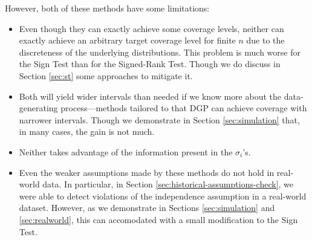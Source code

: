 \documentclass[letterpaper,12pt]{article}
\begin{document}
However, both of these methods have some limitations:
\begin{itemize}
\item Even though they can exactly achieve some coverage levels, neither can exactly achieve an arbitrary target coverage level for finite $n$ due to the discreteness of the underlying distributions. This problem is much worse for the Sign Test than for the Signed-Rank Test. Though we do discuss in Section \ref{sec:st} some approaches to mitigate it.
\item Both will yield wider intervals than needed if we know more about the data-generating process---methods tailored to that DGP can achieve coverage with narrower intervals. Though we demonstrate in Section \ref{sec:simulation} that, in many cases, the gain is not much.
\item Neither takes advantage of the information present in the $\sigma_i$'s.
\item Even the weaker assumptions made by these methods do not hold in real-world data. In particular, in Section \ref{sec:historical-assumptions-check}, we were able to detect violations of the independence assumption in a real-world dataset. However, as we demonstrate in Sections \ref{sec:simulation} and \ref{sec:realworld}, this can accomodated with a small modification to the Sign Test.
\end{itemize}


\twocolumn
\footnotesize

\normalsize
\end{document}
